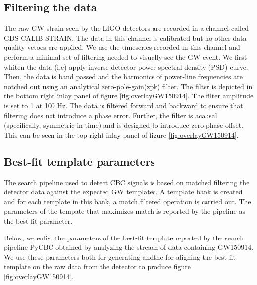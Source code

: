 \subsection{Filtering the data}
The raw GW strain seen by the LIGO detectors are recorded in a channel called GDS-CALIB-STRAIN. The data in this channel is calibrated but no other data quality vetoes are applied. We use the timeseries recorded in this channel and perform a minimal set of filtering needed to visually see the GW event. We first whiten the data (i.e) apply inverse detector power spectral density (PSD) curve. Then, the data is band passed and the harmonics of power-line frequencies are notched out using an analytical zero-pole-gain(zpk) filter. The filter is depicted in the bottom right inlay panel of figure \ref{fig:overlayGW150914}. The filter amplitude is set to 1 at 100 Hz. The data is filtered forward and backward to ensure that filtering does not introduce a phase error. Further, the filter is acausal (specifically, symmetric in time) and is designed to introduce zero-phase offset. This can be seen in the top right inlay panel of figure \ref{fig:overlayGW150914}. 

\subsection{Best-fit template parameters}
The search pipeline used to detect CBC signals is based on matched filtering the detector data against the expected GW templates. A template bank is created and for each template in this bank, a match filtered operation is carried out. The parameters of the tempate that maximizes match is reported by the pipeline as the best fit parameter. 

Below, we enlist the parameters of the best-fit template reported by the search pipeline PyCBC obtained by analyzing the streach of data containing GW150914. We use these parameters both for  generating andthe for  aligning the best-fit template on the raw data from the detector to produce figure \ref{fig:overlayGW150914}. 

